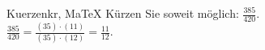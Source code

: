 \begin{MAufgabe}{Kuerzen}{kr, MaTeX}
K\"urzen Sie soweit m\"oglich: $\frac{385}{420}$.\\ 
\ifLsg\MLoesung
\quad $\frac{385}{420}=\frac{(35)\cdot(11)}{(35)\cdot(12)}=\frac{11}{12}$.\else\relax\fi
 \end{MAufgabe}